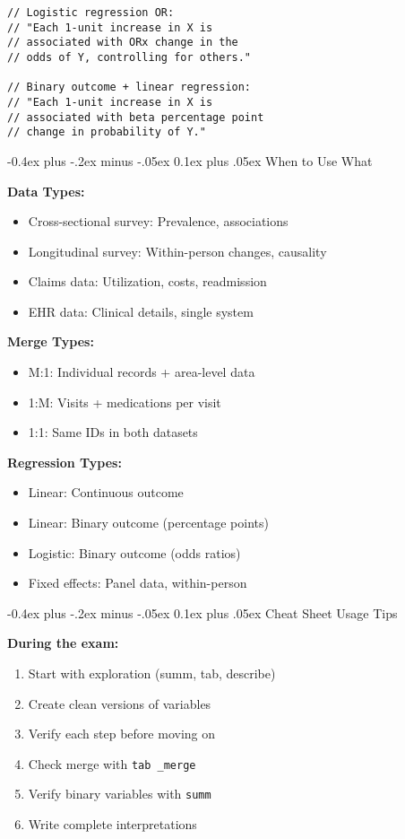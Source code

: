 \documentclass[8pt,letterpaper]{article}
\makeatletter
\renewcommand{\subsection}{\@startsection{subsection}{2}{0mm}%
                                {-0.4ex plus -.2ex minus -.05ex}%
                                {0.1ex plus .05ex}%
                                {\normalfont\fontsize{7.5pt}{7.5pt}\selectfont\bfseries\color{myblue}}}
\makeatother
\begin{document}
\begin{multicols}{2}
\begin{lstlisting}
// Logistic regression OR:
// "Each 1-unit increase in X is
// associated with ORx change in the
// odds of Y, controlling for others."

// Binary outcome + linear regression:
// "Each 1-unit increase in X is
// associated with beta percentage point
// change in probability of Y."
\end{lstlisting}

\subsection{When to Use What}

\textbf{Data Types:}
\begin{itemize}
\item Cross-sectional survey: Prevalence, associations
\item Longitudinal survey: Within-person changes, causality
\item Claims data: Utilization, costs, readmission
\item EHR data: Clinical details, single system
\end{itemize}

\textbf{Merge Types:}
\begin{itemize}
\item M:1: Individual records + area-level data
\item 1:M: Visits + medications per visit
\item 1:1: Same IDs in both datasets
\end{itemize}

\textbf{Regression Types:}
\begin{itemize}
\item Linear: Continuous outcome
\item Linear: Binary outcome (percentage points)
\item Logistic: Binary outcome (odds ratios)
\item Fixed effects: Panel data, within-person
\end{itemize}

\subsection{Cheat Sheet Usage Tips}
\begin{tipbox}
\textbf{During the exam:}
\begin{enumerate}
\item Start with exploration (summ, tab, describe)
\item Create clean versions of variables
\item Verify each step before moving on
\item Check merge with \texttt{tab \_merge}
\item Verify binary variables with \texttt{summ}
\item Write complete interpretations
\end{enumerate}
\end{tipbox}


\end{multicols}
\end{document}
